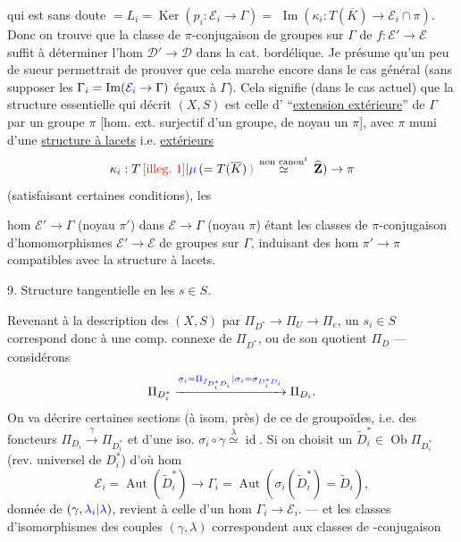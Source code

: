 
qui est sans doute $=L_i=\operatorname{Ker}(p_i:\mathcal{E}_i\to\Gamma)=$  $\operatorname{Im}(\kappa_i:T(\overline{K})\to\mathcal{E}_i\cap\pi)$.
Donc on trouve que  la classe de  $\pi$-conjugaison de groupes sur $\Gamma$ de $f:\mathcal{E}'\to\mathcal{E}$ suffit à déterminer l'hom $\mathcal{D}'\to\mathcal{D}$ dans la cat. bordélique.
Je présume qu'un peu de sueur permettrait de prouver que cela marche encore dans le cas général (sans supposer les $\Gamma_i=\operatorname{Im}(\textcolor{blue}{\mathcal{E}_i}\to\Gamma)$ égaux à $\Gamma$).
Cela signifie (dans le cas actuel) que la structure essentielle qui décrit $(X,S)$ est celle d' ``\uline{extension extérieure}'' de $\Gamma$ par un groupe $\pi$ [hom. ext. surjectif d'un groupe, de noyau un $\pi$], avec $\pi$ muni d'une \uline{structure à lacets} i.e.   \uline{extérieurs}
\[
\kappa_i:T\,\unsure{\text{\deleted{\illegible{1}}}|\mu}\,(=T(\overline{K})\,\unsure{\text{\deleted{)}}}\,\overset{\text{non canon}^{t}}{\simeq}\,\widehat{\mathbf{Z}})\to\pi
\]
(satisfaisant certaines conditions), les



hom  $\mathcal{E}'\to\Gamma$ (noyau $\pi'$) dans $\mathcal{E}\to\Gamma$ (noyau $\pi$) étant les classes de $\pi$-conjugaison d'homomorphismes $\mathcal{E}'\to\mathcal{E}$ de groupes sur $\Gamma$, induisant des hom $\pi'\to\pi$ compatibles avec la structure à lacets.

9. Structure tangentielle en les $s\in S$.

Revenant à la description  des $(X,S)$ par
$\Pi_{D^*}\to\Pi_U\to\Pi_e$, un $s_i\in S$ correspond donc à une comp. connexe  de $\Pi_{D^*}$, ou  de son quotient $\Pi_D$ --- considérons
\[
\Pi_{D_i^*}\xrightarrow{\textcolor{blue}{\sigma_i=\Pi_{f_{D_i^*D_i}}|\sigma_i=\sigma_{D_i^*D_i}}}\Pi_{D_i}.
\]
On va décrire certaines sections (à isom. près) de ce   de groupoïdes, i.e. des  foncteurs
$\Pi_{D_i}\xrightarrow{\gamma}\Pi_{D_i^*}$ et d'une iso. $\sigma_i\circ\gamma\overset{\lambda}{\simeq}\operatorname{id}$.
Si on choisit un $\widetilde{D}_i^*\in\operatorname{Ob}\Pi_{D_i^*}$ (rev. universel de $D_i^*$) d'où hom 
\[
\mathcal{E}_i=\operatorname{Aut}(\widetilde{D}_i^*)\to\Gamma_i
=\operatorname{Aut}(\sigma_i(\widetilde{D}_i^*)=\widetilde{D}_i),
\]
  donnée de $(\gamma,\textcolor{blue}{\lambda_i|\lambda})$,  revient à celle d'un hom $\Gamma_i\to\mathcal{E}_i$.
--- et les classes d'isomorphismes des couples $(\gamma,\lambda)$ correspondent aux classes de -conjugaison

